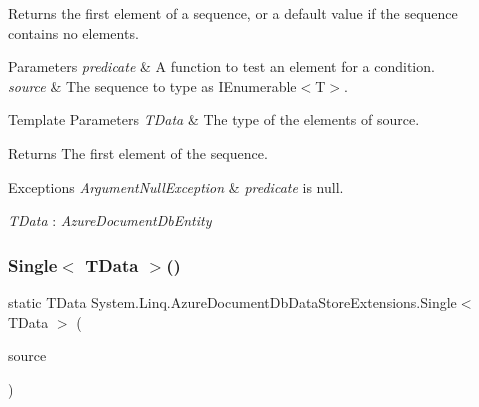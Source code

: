 Returns the first element of a sequence, or a default value if the sequence contains no elements. 


\begin{DoxyParams}{Parameters}
{\em predicate} & A function to test an element for a condition.\\
\hline
{\em source} & The sequence to type as I\+Enumerable$<$\+T$>$.\\
\hline
\end{DoxyParams}

\begin{DoxyTemplParams}{Template Parameters}
{\em T\+Data} & The type of the elements of source.\\
\hline
\end{DoxyTemplParams}
\begin{DoxyReturn}{Returns}
The first element of the sequence.
\end{DoxyReturn}

\begin{DoxyExceptions}{Exceptions}
{\em Argument\+Null\+Exception} & {\itshape predicate}  is null.\\
\hline
\end{DoxyExceptions}
\begin{Desc}
\item[Type Constraints]\begin{description}
\item[{\em T\+Data} : {\em Azure\+Document\+Db\+Entity}]\end{description}
\end{Desc}
\mbox{\label{classSystem_1_1Linq_1_1AzureDocumentDbDataStoreExtensions_a0db5f545a8b606324451bfec69db7862_a0db5f545a8b606324451bfec69db7862}} 
\subsubsection{\texorpdfstring{Single$<$ T\+Data $>$()}{Single< TData >()}\hspace{0.1cm}{\footnotesize\ttfamily [1/2]}}
{\footnotesize\ttfamily static T\+Data System.\+Linq.\+Azure\+Document\+Db\+Data\+Store\+Extensions.\+Single$<$ T\+Data $>$ (\begin{DoxyParamCaption}\item[{this \hyperlink{classCqrs_1_1Azure_1_1DocumentDb_1_1DataStores_1_1AzureDocumentDbDataStore}{Azure\+Document\+Db\+Data\+Store}$<$ T\+Data $>$}]{source }\end{DoxyParamCaption})\hspace{0.3cm}{\ttfamily [static]}}



